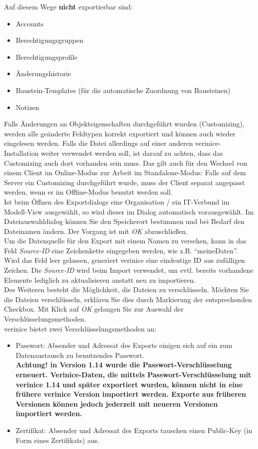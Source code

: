 \documentclass[a4paper,10pt]{book}
\begin{document}
Auf diesem Wege \textbf{nicht} exportierbar sind:
\begin{itemize}
 \item Accounts
 \item Berechtigungsgruppen
 \item Berechtigungsprofile
 \item Änderungshistorie
 \item Baustein-Templates (für die automatische Zuordnung von Bausteinen)
 \item Notizen
\end{itemize}
Falls Änderungen an Objekteigenschaften durchgeführt wurden (Customizing), werden alle geänderte Feldtypen korrekt exportiert und können
auch wieder eingelesen werden. Falls die Datei allerdings auf einer anderen verinice-Installation weiter verwendet werden soll, ist darauf
zu achten, dass das Customizing auch dort vorhanden sein muss. Das gilt auch für den Wechsel von einem Client im Online-Modus zur Arbeit
im Standalone-Modus: Falls auf dem Server ein Customizing durchgeführt wurde, muss der Client separat angepasst werden, wenn er im Offline-Modus
benutzt werden soll.
\newline\\
Ist beim Öffnen des Exportdialogs eine Organisation / ein IT-Verbund im Modell-View ausgewählt, so wird dieser im Dialog automatisch vorausgewählt.
Im Dateiauswahldialog können Sie den Speicherort bestimmen und bei Bedarf den Dateinamen ändern. Der Vorgang ist mit  \textit{OK} abzuschließen.
\newline\\
Um die Datenquelle für den Export mit einem Namen zu versehen, kann in das Feld \textit{Source-ID} eine Zeichenkette eingegeben werden, wie z.B.
``meineDaten''. Wird das Feld leer gelassen, generiert verinice eine eindeutige ID aus zufälligen Zeichen. Die \textit{Source-ID} wird beim Import verwendet,
um evtl. bereits vorhandene Elemente lediglich zu aktualisieren anstatt neu zu importieren.
\newline\\
Des Weiteren besteht die Möglichkeit, die Dateien zu verschlüsseln. Möchten Sie die Dateien verschlüsseln, erklären Sie dies durch Markierung der
entsprechenden Checkbox. Mit Klick auf \textit{OK} gelangen Sie zur Auswahl der Verschlüsselungsmethoden.
\newline\\
verinice bietet zwei Verschlüsselungsmethoden an:
\begin{itemize}
\item Passwort: Absender und Adressat des Exports einigen sich auf ein
  zum
  Datenaustausch zu benutzendes Passwort.\\
  \textbf{Achtung! in Version 1.14 wurde die Passwort-Verschlüsselung
    erneuert.  Verinice-Daten, die mittels Passwort-Verschlüsselung
    mit verinice 1.14 und später exportiert wurden, können nicht in
    eine frühere verinice Version importiert werden. Exporte aus
    früheren Versionen können jedoch jederzeit mit neueren Versionen
    importiert werden.}
 \item Zertifikat: Absender und Adressat des Exports tauschen einen Public-Key (in Form eines Zertifikats) aus.
\end{itemize}
\end{document}
